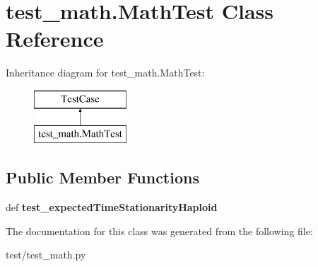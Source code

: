 \hypertarget{classtest__math_1_1_math_test}{\section{test\-\_\-math.\-Math\-Test Class Reference}
\label{classtest__math_1_1_math_test}
}
Inheritance diagram for test\-\_\-math.\-Math\-Test\-:\begin{figure}[H]
\begin{center}
\leavevmode
\includegraphics[height=2.000000cm]{classtest__math_1_1_math_test}
\end{center}
\end{figure}
\subsection*{Public Member Functions}
\begin{DoxyCompactItemize}
\item 
\hypertarget{classtest__math_1_1_math_test_a17a48883f0f84b75af8bd91d68fcb941}{def {\bfseries test\-\_\-expected\-Time\-Stationarity\-Haploid}}\label{classtest__math_1_1_math_test_a17a48883f0f84b75af8bd91d68fcb941}

\end{DoxyCompactItemize}


The documentation for this class was generated from the following file\-:\begin{DoxyCompactItemize}
\item 
test/test\-\_\-math.\-py\end{DoxyCompactItemize}
